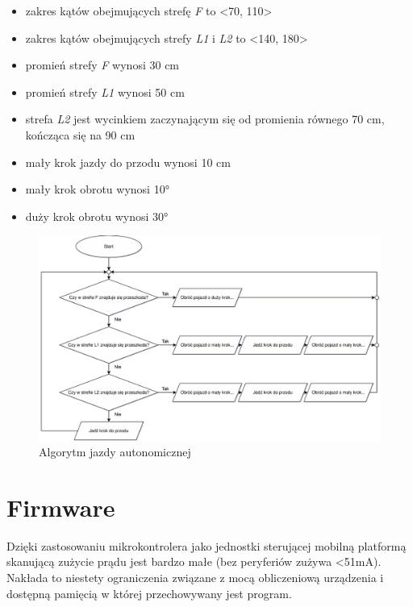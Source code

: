 \begin{itemize}
    \item zakres kątów obejmujących strefę \emph{F} to <70, 110>
    \item zakres kątów obejmujących strefy \emph{L1} i \emph{L2} to <140, 180>
    \item promień strefy \emph{F} wynosi 30 cm
    \item promień strefy \emph{L1} wynosi 50 cm
    \item strefa \emph{L2} jest wycinkiem zaczynającym się od promienia równego 70 cm, kończąca się na 90 cm
    \item mały krok jazdy do przodu wynosi 10 cm
    \item mały krok obrotu wynosi 10°
    \item duży krok obrotu wynosi 30°
\end{itemize}

\begin{figure}[ht]
	\centering
		\includegraphics[width=1\linewidth]{rys/autodrive-algorithm.pdf}
	\caption{Algorytm jazdy autonomicznej}
	\label{fig:autodrive-algorithm}
\end{figure}

\section{Firmware}
\label{sec:firmware}
Dzięki zastosowaniu mikrokontrolera jako jednostki sterującej mobilną platformą skanującą zużycie prądu jest bardzo małe (bez peryferiów zużywa <51mA\cite{stm32-datasheet}). Nakłada to niestety ograniczenia związane z mocą obliczeniową urządzenia i dostępną pamięcią w której przechowywany jest program. 

